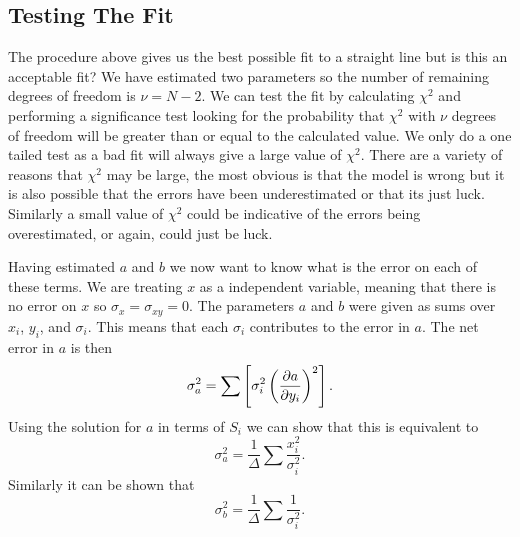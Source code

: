 \documentclass[a4paper]{article}
\begin{document}
    \subsection{Testing The Fit}
    The procedure above gives us the best possible fit to a straight line but is this an acceptable fit?
    We have estimated two parameters so the number of remaining degrees of freedom is \(\nu = N - 2\).
    We can test the fit by calculating \(\chi^2\) and performing a significance test looking for the probability that \(\chi^2\) with \(\nu\) degrees of freedom will be greater than or equal to the calculated value.
    We only do a one tailed test as a bad fit will always give a large value of \(\chi^2\).
    There are a variety of reasons that \(\chi^2\) may be large, the most obvious is that the model is wrong but it is also possible that the errors have been underestimated or that its just luck.
    Similarly a small value of \(\chi^2\) could be indicative of the errors being overestimated, or again, could just be luck.
    
    Having estimated \(a\) and \(b\) we now want to know what is the error on each of these terms.
    We are treating \(x\) as a independent variable, meaning that there is no error on \(x\) so \(\sigma_x = \sigma_{xy} = 0\).
    The parameters \(a\) and \(b\) were given as sums over \(x_i\), \(y_i\), and \(\sigma_i\).
    This means that each \(\sigma_i\) contributes to the error in \(a\).
    The net error in \(a\) is then
    \[\sigma_a^2 = \sum \left[\sigma_i^2 \left(\pdv{a}{y_i}\right)^2\right].\]
    Using the solution for \(a\) in terms of \(S_i\) we can show that this is equivalent to
    \[\sigma_a^2 = \frac{1}{\Delta}\sum \frac{x_i^2}{\sigma_i^2}.\]
    Similarly it can be shown that
    \[\sigma_b^2 = \frac{1}{\Delta}\sum \frac{1}{\sigma_i^2}.\]
    
\end{document}
